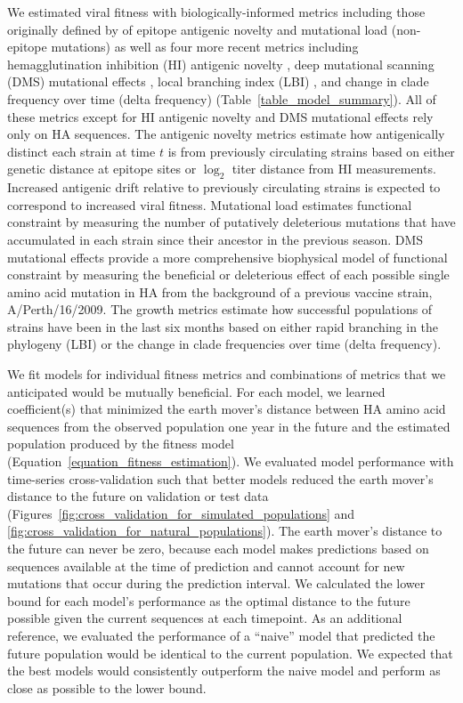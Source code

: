 We estimated viral fitness with biologically-informed metrics including those originally defined by \cite{Luksza:2014hj} of epitope antigenic novelty and mutational load (non-epitope mutations) as well as four more recent metrics including hemagglutination inhibition (HI) antigenic novelty \citep{Neher:2016hy}, deep mutational scanning (DMS) mutational effects \citep{Lee2018}, local branching index (LBI) \citep{Neher:2014eu}, and change in clade frequency over time (delta frequency) (Table~\ref{table_model_summary}).
All of these metrics except for HI antigenic novelty and DMS mutational effects rely only on HA sequences.
The antigenic novelty metrics estimate how antigenically distinct each strain at time $t$ is from previously circulating strains based on either genetic distance at epitope sites or $\log_{2}$ titer distance from HI measurements.
Increased antigenic drift relative to previously circulating strains is expected to correspond to increased viral fitness.
Mutational load estimates functional constraint by measuring the number of putatively deleterious mutations that have accumulated in each strain since their ancestor in the previous season.
DMS mutational effects provide a more comprehensive biophysical model of functional constraint by measuring the beneficial or deleterious effect of each possible single amino acid mutation in HA from the background of a previous vaccine strain, A/Perth/16/2009.
The growth metrics estimate how successful populations of strains have been in the last six months based on either rapid branching in the phylogeny (LBI) or the change in clade frequencies over time (delta frequency).

We fit models for individual fitness metrics and combinations of metrics that we anticipated would be mutually beneficial.
For each model, we learned coefficient(s) that minimized the earth mover's distance between HA amino acid sequences from the observed population one year in the future and the estimated population produced by the fitness model (Equation~\ref{equation_fitness_estimation}).
We evaluated model performance with time-series cross-validation such that better models reduced the earth mover's distance to the future on validation or test data (Figures~\ref{fig:cross_validation_for_simulated_populations} and \ref{fig:cross_validation_for_natural_populations}).
The earth mover's distance to the future can never be zero, because each model makes predictions based on sequences available at the time of prediction and cannot account for new mutations that occur during the prediction interval.
We calculated the lower bound for each model's performance as the optimal distance to the future possible given the current sequences at each timepoint.
As an additional reference, we evaluated the performance of a ``naive'' model that predicted the future population would be identical to the current population.
We expected that the best models would consistently outperform the naive model and perform as close as possible to the lower bound.

